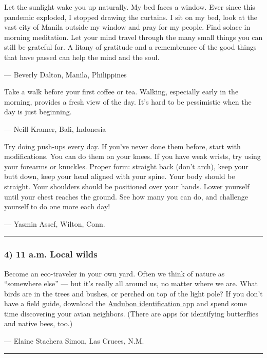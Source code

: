 Let the sunlight wake you up naturally. My bed faces a window. Ever
since this pandemic exploded, I stopped drawing the curtains. I sit on
my bed, look at the vast city of Manila outside my window and pray for
my people. Find solace in morning meditation. Let your mind travel
through the many small things you can still be grateful for. A litany of
gratitude and a remembrance of the good things that have passed can help
the mind and the soul.

--- Beverly Dalton, Manila, Philippines

Take a walk before your first coffee or tea. Walking, especially early
in the morning, provides a fresh view of the day. It's hard to be
pessimistic when the day is just beginning.

--- Neill Kramer, Bali, Indonesia

Try doing push-ups every day. If you've never done them before, start
with modifications. You can do them on your knees. If you have weak
wrists, try using your forearms or knuckles. Proper form: straight back
(don't arch), keep your butt down, keep your head aligned with your
spine. Your body should be straight. Your shoulders should be positioned
over your hands. Lower yourself until your chest reaches the ground. See
how many you can do, and challenge yourself to do one more each day!

--- Yasmin Assef, Wilton, Conn.

\begin{center}\rule{0.5\linewidth}{\linethickness}\end{center}

\hypertarget{4-11-am-local-wilds}{%
\subsubsection{\texorpdfstring{\textbf{4) 11 a.m. Local
wilds}}{4) 11 a.m. Local wilds}}\label{4-11-am-local-wilds}}

Become an eco-traveler in your own yard. Often we think of nature as
``somewhere else'' --- but it's really all around us, no matter where we
are. What birds are in the trees and bushes, or perched on top of the
light pole? If you don't have a field guide, download the
\href{https://www.audubon.org/}{Audubon identification app} and spend
some time discovering your avian neighbors. (There are apps for
identifying butterflies and native bees, too.)

--- Elaine Stachera Simon, Las Cruces, N.M.

\begin{center}\rule{0.5\linewidth}{\linethickness}\end{center}

